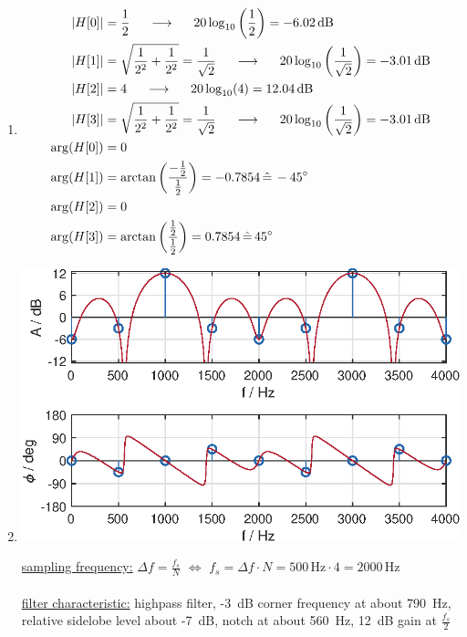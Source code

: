\documentclass[11pt,a4paper,DIV=12]{scrartcl}
\begin{document}
\begin{Loesung}
\begin{enumerate}[label=\alph*)]
	\item \begin{align}
	|H[0]|&=\frac{1}{2} \hspace{5mm}\longrightarrow\hspace{5mm} 20\log_{10}\left(\frac{1}{2}\right)=-6.02\,\text{dB}\nonumber\\
	|H[1]|&=\sqrt{\frac{1}{2^2}+\frac{1}{2^2}}=\frac{1}{\sqrt{2}} \hspace{5mm}\longrightarrow\hspace{5mm} 20\log_{10}\left(\frac{1}{\sqrt{2}}\right)=-3.01\,\text{dB}\nonumber\\
	|H[2]|&=4 \hspace{5mm}\longrightarrow\hspace{5mm} 20\log_{10}(4)=12.04\,\text{dB}\nonumber\\
	|H[3]|&=\sqrt{\frac{1}{2^2}+\frac{1}{2^2}}=\frac{1}{\sqrt{2}} \hspace{5mm}\longrightarrow\hspace{5mm} 20\log_{10}\left(\frac{1}{\sqrt{2}}\right)=-3.01\,\text{dB}\nonumber\\
	\arg(H[0])&=0\nonumber\\
	\arg(H[1])&=\arctan\left(\frac{-\frac{1}{2}}{\frac{1}{2}}\right)=-0.7854\,\hat{=}\,-45^{\circ}\nonumber\\
	\arg(H[2])&=0\nonumber\\
	\arg(H[3])&=\arctan\left(\frac{\frac{1}{2}}{\frac{1}{2}}\right)=0.7854\,\hat{=}\,45^{\circ}\nonumber
	\end{align}
	\item \text{}
	\begin{center}%
		\includegraphics[]{graphics/UE1_Exercise4_Spectrum}%
	\end{center}%
	\underline{sampling frequency:} $\Delta f=\frac{f_s}{N}\,\,\Leftrightarrow\,\,f_s=\Delta f\cdot N=500\,\text{Hz}\cdot4=2000\,\text{Hz}$\\\\
	\underline{filter characteristic:} highpass filter, -3~dB corner frequency at
	about 790~Hz, relative sidelobe level about -7~dB, notch at about 560~Hz,
	12~dB gain at $\frac{f_s}{2}$
\end{enumerate}
\end{Loesung}
\end{document}

